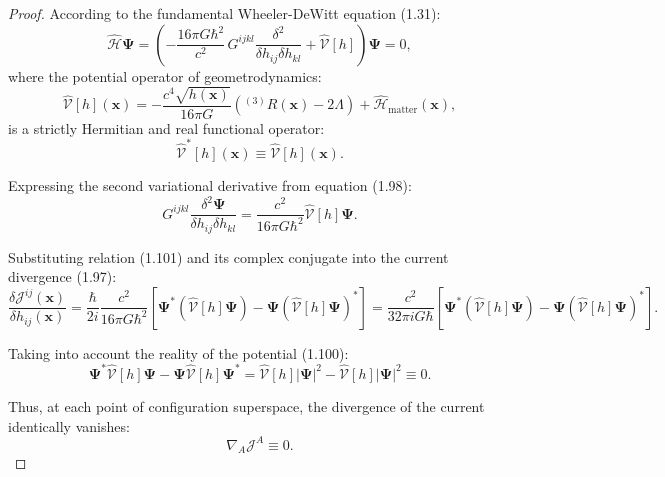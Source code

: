 \begin{proof}
According to the fundamental Wheeler-DeWitt equation (1.31):
\begin{equation}\label{eq:1.98}\tag{1.98}
\hat{\mathcal{H}} \mathbf{\Psi} = \left( -\frac{16\pi G \hbar^2}{c^2} \, G^{ijkl} \frac{\delta^2}{\delta h_{ij} \delta h_{kl}} + \hat{\mathcal{V}}[h] \right) \mathbf{\Psi} = 0,
\end{equation}
where the potential operator of geometrodynamics:
\begin{equation}\label{eq:1.99}\tag{1.99}
\hat{\mathcal{V}}[h](\mathbf{x}) = -\frac{c^4 \sqrt{h(\mathbf{x})}}{16\pi G} \left( {}^{(3)}R(\mathbf{x}) - 2\Lambda \right) + \hat{\mathcal{H}}_{\text{matter}}(\mathbf{x}),
\end{equation}
is a strictly Hermitian and real functional operator:
\begin{equation}\label{eq:1.100}\tag{1.100}
\hat{\mathcal{V}}^*[h](\mathbf{x}) \equiv \hat{\mathcal{V}}[h](\mathbf{x}).
\end{equation}

Expressing the second variational derivative from equation (1.98):
\begin{equation}\label{eq:1.101}\tag{1.101}
G^{ijkl} \frac{\delta^2 \mathbf{\Psi}}{\delta h_{ij} \delta h_{kl}} = \frac{c^2}{16\pi G \hbar^2} \hat{\mathcal{V}}[h] \mathbf{\Psi}.
\end{equation}

Substituting relation (1.101) and its complex conjugate into the current divergence (1.97):
\begin{equation}\label{eq:1.102}\tag{1.102}
\frac{\delta \mathcal{J}^{ij}(\mathbf{x})}{\delta h_{ij}(\mathbf{x})} = \frac{\hbar}{2i} \frac{c^2}{16\pi G \hbar^2} \left[ \mathbf{\Psi}^* \left( \hat{\mathcal{V}}[h] \mathbf{\Psi} \right) - \mathbf{\Psi} \left( \hat{\mathcal{V}}[h] \mathbf{\Psi} \right)^* \right] = \frac{c^2}{32\pi i G \hbar} \left[ \mathbf{\Psi}^* \left( \hat{\mathcal{V}}[h] \mathbf{\Psi} \right) - \mathbf{\Psi} \left( \hat{\mathcal{V}}[h] \mathbf{\Psi} \right)^* \right].
\end{equation}

Taking into account the reality of the potential (1.100):
\begin{equation}\label{eq:1.103}\tag{1.103}
\mathbf{\Psi}^* \hat{\mathcal{V}}[h] \mathbf{\Psi} - \mathbf{\Psi} \hat{\mathcal{V}}[h] \mathbf{\Psi}^* = \hat{\mathcal{V}}[h] |\mathbf{\Psi}|^2 - \hat{\mathcal{V}}[h] |\mathbf{\Psi}|^2 \equiv 0.
\end{equation}

Thus, at each point of configuration superspace, the divergence of the current identically vanishes:
\begin{equation}\label{eq:1.104}\tag{1.104}
\nabla_A \mathcal{J}^A \equiv 0.
\end{equation}


\end{proof}
